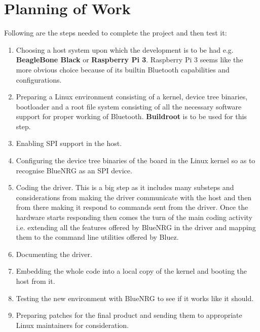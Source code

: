 \chapter{Planning of Work}
Following are the steps needed to complete the project and then test it:
\begin{enumerate}
	\item Choosing a host system upon which the development is to be had e.g. \textbf{BeagleBone Black} or \textbf{Raspberry Pi 3}. Raspberry Pi 3 seems like the more obvious choice because of its builtin Bluetooth capabilities and configurations.
	\item Preparing a Linux environment consisting of a kernel, device tree binaries, bootloader and a root file system consisting of all the necessary software support for proper working of Bluetooth. \textbf{Buildroot} is to be used for this step.
	\item Enabling SPI support in the host.
	\item Configuring the device tree binaries of the board in the Linux kernel so as to recognise BlueNRG as an SPI device.
	\item Coding the driver. This is a big step as it includes many substeps and considerations from making the driver communicate with the host and then from there making it respond to commands sent from the driver. Once the hardware starts responding then comes the turn of the main coding activity i.e. extending all the features offered by BlueNRG in the driver and mapping them to the command line utilities offered by Bluez.
	\item Documenting the driver.
	\item Embedding the whole code into a local copy of the kernel and booting the host from it.
	\item Testing the new environment with BlueNRG to see if it works like it should.
	\item Preparing patches for the final product and sending them to appropriate Linux maintainers for consideration.
\end{enumerate}
